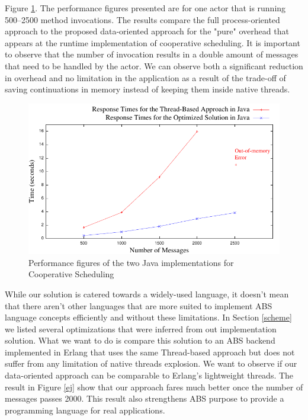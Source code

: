 \par Figure \ref{jj}. The performance figures presented are for one actor that is running 500--2500 method invocations. 
The results compare the full process-oriented approach to the proposed data-oriented approach for the "pure" overhead that appears at the runtime implementation of cooperative scheduling. It is important to observe that the number of invocation results in a double amount of messages that need to be handled by the actor. We can observe both a significant reduction in overhead and no limitation in the application as a result of the trade-off of saving continuations in memory instead of keeping them inside native threads.


\begin{figure}
	\label{jj}
	\centering
	\includegraphics[scale=1]{jaj8.pdf}
	\caption{Performance figures of the two Java implementations for Cooperative Scheduling}
\end{figure}

\par While our solution is catered towards a widely-used language, it doesn't mean that there aren't other languages that are more suited to implement ABS language concepts efficiently and without these limitations. In Section \ref{scheme} we listed several optimizations that were inferred from out implementation solution. What we want to do is compare this solution to an ABS backend implemented in Erlang that uses the same Thread-based approach but does not suffer from any limitation of native threads explosion. We want to observe if our data-oriented approach can be comparable to Erlang's lightweight threads. The result in Figure \ref{ej} show that our approach fares much better once the number of messages passes 2000. This result also strengthens ABS purpose to provide a programming language for real applications.

